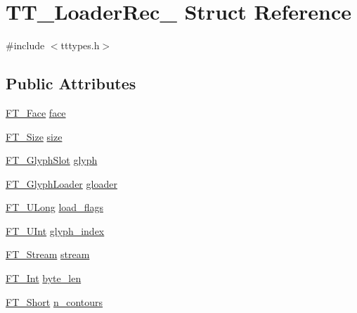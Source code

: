 \hypertarget{struct_t_t___loader_rec__}{\section{T\-T\-\_\-\-Loader\-Rec\-\_\- Struct Reference}
\label{struct_t_t___loader_rec__}
}


{\ttfamily \#include $<$tttypes.\-h$>$}

\subsection*{Public Attributes}
\begin{DoxyCompactItemize}
\item 
\hyperlink{freetype_8h_a7eba045ee20968354fa1bff0f69740fa}{F\-T\-\_\-\-Face} \hyperlink{struct_t_t___loader_rec___a03a83a2bdc0a10698a72ade8ae5700d2}{face}
\item 
\hyperlink{freetype_8h_a791d0ff3273ca9628a523efd98d138c1}{F\-T\-\_\-\-Size} \hyperlink{struct_t_t___loader_rec___a9b819b48f7c9d3efd4960700060ccefc}{size}
\item 
\hyperlink{freetype_8h_a768daa0d9c3fa499e6c37034ee9f2ca3}{F\-T\-\_\-\-Glyph\-Slot} \hyperlink{struct_t_t___loader_rec___a7843d7a665f8535faadf1bf1ec87b683}{glyph}
\item 
\hyperlink{ftgloadr_8h_a2671bcb107327e81037ea42332454741}{F\-T\-\_\-\-Glyph\-Loader} \hyperlink{struct_t_t___loader_rec___a5c24ef5e731e4d9953be8ede99d6cf54}{gloader}
\item 
\hyperlink{fttypes_8h_a4fac88bdba78eb76b505efa6e4fbf3f5}{F\-T\-\_\-\-U\-Long} \hyperlink{struct_t_t___loader_rec___a19ca6de6b384c1b6143275a485a3160f}{load\-\_\-flags}
\item 
\hyperlink{fttypes_8h_abcb8db4dbf35d2b55a9e8c7b0926dc52}{F\-T\-\_\-\-U\-Int} \hyperlink{struct_t_t___loader_rec___a5486105cac09d372c0971c237585b135}{glyph\-\_\-index}
\item 
\hyperlink{ftsystem_8h_a788b32c932932f7411a8dfa7f6c794bf}{F\-T\-\_\-\-Stream} \hyperlink{struct_t_t___loader_rec___abb44841d62cecea6dd413be951eae241}{stream}
\item 
\hyperlink{fttypes_8h_af90e5fb0d07e21be9fe6faa33f02484c}{F\-T\-\_\-\-Int} \hyperlink{struct_t_t___loader_rec___a43c6befa8051373b8d18e6a60c6bee30}{byte\-\_\-len}
\item 
\hyperlink{fttypes_8h_aa7279be89046a2563cd3d4d6651fbdcf}{F\-T\-\_\-\-Short} \hyperlink{struct_t_t___loader_rec___a829910a8b1d82620efa96bf25a119e35}{n\-\_\-contours}

\end{DoxyCompactItemize}
